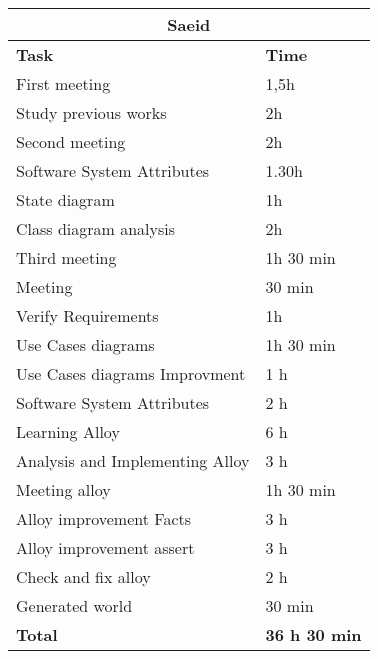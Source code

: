 \begin{table}[H]
\begin{tabular}{|l|l|}
\hline
\multicolumn{2}{|c|}{\textbf{Saeid}}            \\ \hline
\textbf{Task}                   & \textbf{Time} \\ \hline
First meeting                   & 1,5h          \\ \hline
Study previous works            & 2h            \\ \hline
Second meeting                  & 2h            \\ \hline
Software System Attributes      & 1.30h         \\ \hline
State diagram                   & 1h            \\ \hline
Class diagram analysis          & 2h            \\ \hline
Third meeting                   & 1h 30 min     \\ \hline
Meeting                         & 30 min        \\ \hline
Verify Requirements             & 1h            \\ \hline
Use Cases diagrams              & 1h 30 min     \\ \hline
Use Cases diagrams Improvment   & 1 h           \\ \hline
Software System Attributes      & 2 h           \\ \hline
Learning Alloy                  & 6 h           \\ \hline
Analysis and Implementing Alloy & 3 h           \\ \hline
Meeting alloy                   & 1h 30 min     \\ \hline
Alloy improvement Facts         & 3 h           \\ \hline
Alloy improvement assert        & 3 h           \\ \hline
Check and fix alloy             & 2 h           \\ \hline
Generated world                 & 30 min         \\ \hline
\rowcolor {polilight}
\textbf{Total}                  & \textbf{36 h 30 min}   \\ \hline
\end{tabular}
\end{table}
